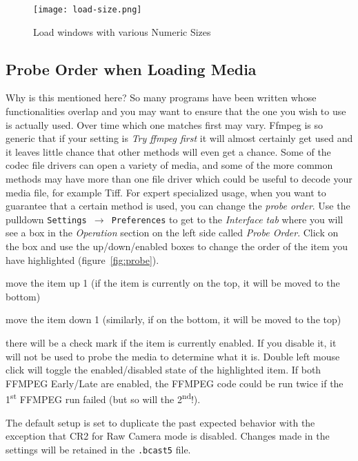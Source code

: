 \begin{figure}[htpb]
    \centering
    \texttt{[image: load-size.png]}
    \caption{Load windows with various Numeric Sizes}
    \label{fig:load-size}
\end{figure}

\subsection{Probe Order when Loading Media}%
\label{sub:probe_order_loading_media}

Why is this mentioned here?  So many programs have been written whose functionalities overlap and you may want to ensure that the one you wish to use is actually used.  Over time which one matches first may vary.  Ffmpeg is so generic that if your setting is \textit{Try ffmpeg first} it will almost certainly get used and it leaves little chance that other methods will even get a chance.  Some of the codec file drivers can open a variety of media, and some of the more common methods may have more than one file driver which could be useful to decode your media file, for example Tiff.  For expert specialized usage, when you want to guarantee that a certain method is used, you can change the \textit{probe order}.  Use the pulldown \texttt{Settings $\rightarrow$ Preferences} to get to the \textit{Interface tab} where you will see a box in the \textit{Operation} section on the left side called \textit{Probe Order}.  Click on the box and use the up/down/enabled boxes to change the order of the item you have highlighted (figure~\ref{fig:probe}).

\begin{description} [noitemsep]
    \item[Up] move the item up 1 (if the item is currently on the top, it will be moved to the bottom)
    \item[Down] move the item down 1 (similarly, if on the bottom, it will be moved to the top)
    \item[Enable] there will be a check mark if the item is currently enabled.  If you disable it, it will not be used to probe the media to determine what it is.  Double left mouse click will toggle the enabled/disabled state of the highlighted item.  If both FFMPEG Early/Late are enabled, the FFMPEG code could be run twice if the 1\textsuperscript{st} FFMPEG run failed (but so will the 2\textsuperscript{nd}!).
\end{description}

The default setup is set to duplicate the past expected behavior with the exception that CR2 for Raw Camera mode is disabled.  Changes made in the settings will be retained in the \texttt{.bcast5} file.

